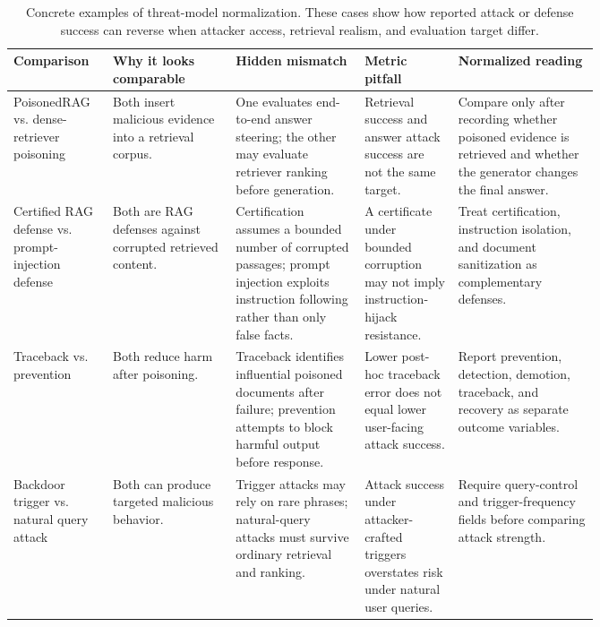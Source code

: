 \documentclass[11pt]{article}
\begin{document}
\begin{table}[t]
\centering
\scriptsize
\renewcommand{\arraystretch}{0.88}
\begin{tabularx}{\linewidth}{>{\raggedright\arraybackslash}p{0.17\linewidth}>{\raggedright\arraybackslash}p{0.21\linewidth}>{\raggedright\arraybackslash}p{0.22\linewidth}>{\raggedright\arraybackslash}p{0.16\linewidth}X}
\toprule
\textbf{Comparison} & \textbf{Why it looks comparable} & \textbf{Hidden mismatch} & \textbf{Metric pitfall} & \textbf{Normalized reading} \\
\midrule
PoisonedRAG vs. dense-retriever poisoning & Both insert malicious evidence into a retrieval corpus. & One evaluates end-to-end answer steering; the other may evaluate retriever ranking before generation. & Retrieval success and answer attack success are not the same target. & Compare only after recording whether poisoned evidence is retrieved and whether the generator changes the final answer. \\
Certified RAG defense vs. prompt-injection defense & Both are RAG defenses against corrupted retrieved content. & Certification assumes a bounded number of corrupted passages; prompt injection exploits instruction following rather than only false facts. & A certificate under bounded corruption may not imply instruction-hijack resistance. & Treat certification, instruction isolation, and document sanitization as complementary defenses. \\
Traceback vs. prevention & Both reduce harm after poisoning. & Traceback identifies influential poisoned documents after failure; prevention attempts to block harmful output before response. & Lower post-hoc traceback error does not equal lower user-facing attack success. & Report prevention, detection, demotion, traceback, and recovery as separate outcome variables. \\
Backdoor trigger vs. natural query attack & Both can produce targeted malicious behavior. & Trigger attacks may rely on rare phrases; natural-query attacks must survive ordinary retrieval and ranking. & Attack success under attacker-crafted triggers overstates risk under natural user queries. & Require query-control and trigger-frequency fields before comparing attack strength. \\
\bottomrule
\end{tabularx}
\caption{Concrete examples of threat-model normalization. These cases show how reported attack or defense success can reverse when attacker access, retrieval realism, and evaluation target differ.}
\label{tab:threat-model-examples}
\end{table}
\end{document}
